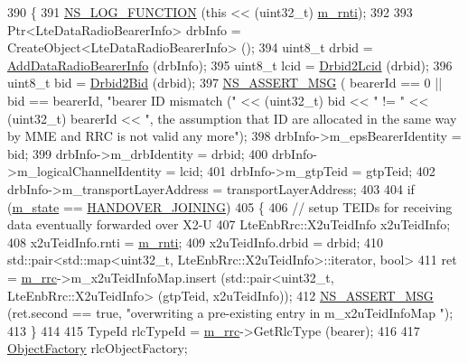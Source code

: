 \begin{DoxyCode}
390 \{
391   \hyperlink{log-macros-disabled_8h_a90b90d5bad1f39cb1b64923ea94c0761}{NS\_LOG\_FUNCTION} (\textcolor{keyword}{this} << (uint32\_t) \hyperlink{classns3_1_1UeManager_a5a72b4fe818f21993bd7f05d7e2c4f83}{m\_rnti});
392 
393   Ptr<LteDataRadioBearerInfo> drbInfo = CreateObject<LteDataRadioBearerInfo> ();
394   uint8\_t drbid = \hyperlink{classns3_1_1UeManager_a445cf5c9036a101af33526a4ebb89863}{AddDataRadioBearerInfo} (drbInfo);
395   uint8\_t lcid = \hyperlink{classns3_1_1UeManager_af0ba90c3b4fe3300796ffc03de328f73}{Drbid2Lcid} (drbid); 
396   uint8\_t bid = \hyperlink{classns3_1_1UeManager_a7f9cf28eee4b60f195e9f4577a8a3a35}{Drbid2Bid} (drbid);
397   \hyperlink{assert_8h_aff5ece9066c74e681e74999856f08539}{NS\_ASSERT\_MSG} ( bearerId == 0 || bid == bearerId, \textcolor{stringliteral}{"bearer ID mismatch ("} << (uint32\_t) bid 
      << \textcolor{stringliteral}{" != "} << (uint32\_t) bearerId << \textcolor{stringliteral}{", the assumption that ID are allocated in the same way by MME and RRC is
       not valid any more"});
398   drbInfo->m\_epsBearerIdentity = bid;
399   drbInfo->m\_drbIdentity = drbid;
400   drbInfo->m\_logicalChannelIdentity = lcid;
401   drbInfo->m\_gtpTeid = gtpTeid;
402   drbInfo->m\_transportLayerAddress = transportLayerAddress;
403 
404   \textcolor{keywordflow}{if} (\hyperlink{classns3_1_1UeManager_aaed4b2490297cb912e743084f1a27b08}{m\_state} == \hyperlink{classns3_1_1UeManager_a2f4085fdd18d7125c27da44a5b8b6808a093669f7255c35aa11645ba004a896ea}{HANDOVER\_JOINING})
405     \{
406       \textcolor{comment}{// setup TEIDs for receiving data eventually forwarded over X2-U }
407       LteEnbRrc::X2uTeidInfo x2uTeidInfo;
408       x2uTeidInfo.rnti = \hyperlink{classns3_1_1UeManager_a5a72b4fe818f21993bd7f05d7e2c4f83}{m\_rnti};
409       x2uTeidInfo.drbid = drbid;
410       std::pair<std::map<uint32\_t, LteEnbRrc::X2uTeidInfo>::iterator, \textcolor{keywordtype}{bool}>
411       ret = \hyperlink{classns3_1_1UeManager_ab4405e9f354c66e7c1a4c95832290f5b}{m\_rrc}->m\_x2uTeidInfoMap.insert (std::pair<uint32\_t, LteEnbRrc::X2uTeidInfo> (gtpTeid, 
      x2uTeidInfo));
412       \hyperlink{assert_8h_aff5ece9066c74e681e74999856f08539}{NS\_ASSERT\_MSG} (ret.second == \textcolor{keyword}{true}, \textcolor{stringliteral}{"overwriting a pre-existing entry in m\_x2uTeidInfoMap
      "});
413     \}
414 
415   TypeId rlcTypeId = \hyperlink{classns3_1_1UeManager_ab4405e9f354c66e7c1a4c95832290f5b}{m\_rrc}->GetRlcType (bearer);
416 
417   \hyperlink{classns3_1_1Object_a2810e70b8c8377aa8617138fc0f65e92}{ObjectFactory} rlcObjectFactory;

\end{DoxyCode}
